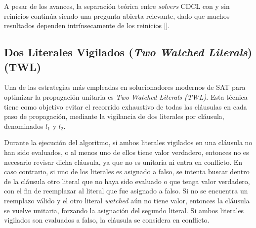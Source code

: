 

A pesar de los avances, la separación teórica entre \textit{solvers} CDCL con y sin reinicios continúa siendo una pregunta abierta relevante, dado que muchos resultados dependen intrínsecamente de los reinicios [\cite{zulkoski2018understanding}].

\subsection{Dos Literales Vigilados (\textit{Two Watched Literals}) (TWL)}
\label{subsec:twl}

Una de las estrategias m\'as empleadas en solucionadores modernos de SAT para optimizar la propagaci\'on unitaria es \textit{Two Watched Literals (TWL)}. Esta t\'ecnica tiene como objetivo evitar el recorrido exhaustivo de todas las cl\'ausulas en cada paso de propagaci\'on, mediante la vigilancia de dos literales por cl\'ausula, denominados $l_1$ y $l_2$.

Durante la ejecuci\'on del algoritmo, si ambos literales vigilados en una cl\'ausula no han sido evaluados, o al menos uno de ellos tiene valor verdadero, entonces no es necesario revisar dicha cl\'ausula, ya que no es unitaria ni entra en conflicto. En caso contrario, si uno de los literales es asignado a falso, se intenta buscar dentro de la cl\'ausula otro literal que no haya sido evaluado o que tenga valor verdadero, con el fin de reemplazar al literal que fue asignado a falso. Si no se encuentra un reemplazo v\'alido y el otro literal \textit{watched} a\'un no tiene valor, entonces la cl\'ausula se vuelve unitaria, forzando la asignaci\'on del segundo literal. Si ambos literales vigilados son evaluados a falso, la cl\'ausula se considera en conflicto.

